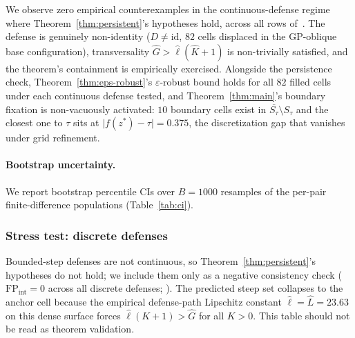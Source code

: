 \documentclass{article}
\newcommand{\cl}[1]{\overline{#1}}
\begin{document}
\begin{table}[h]
\centering
\small
\caption{Resolution sweep for the oblique-smooth defense at
progressively finer MAP-Elites grid sizes.}
\label{tab:resolution}

\end{table}

We observe zero empirical counterexamples in the
continuous-defense regime where Theorem~\ref{thm:persistent}'s
hypotheses hold, across all rows
of~.
The defense is genuinely non-identity ($D \neq \mathrm{id}$, $82$
cells displaced in the GP-oblique base configuration),
transversality $\hat G > \hat\ell(\hat K{+}1)$ is non-trivially
satisfied, and the theorem's containment is empirically
exercised. Alongside the persistence check,
Theorem~\ref{thm:eps-robust}'s $\varepsilon$-robust bound holds
for all $82$ filled cells under each continuous defense tested,
and Theorem~\ref{thm:main}'s boundary fixation is non-vacuously
activated: $10$ boundary cells exist in
$\cl{S_\tau} \setminus S_\tau$ and the closest one to $\tau$ sits
at $\lvert f(z^{*}) - \tau \rvert = 0.375$, the discretization
gap that vanishes under grid refinement.

\paragraph{Bootstrap uncertainty.}
We report bootstrap percentile CIs over $B = 1000$ resamples of
the per-pair finite-difference populations
(Table~\ref{tab:ci}).

\begin{table}[h]
\centering
\small
\caption{Bootstrap percentile CIs (median,
$[5^{\text{th}}, 95^{\text{th}}]$) over $B = 1000$ resamples of
the per-pair finite-difference populations on the saturated
live run.}
\label{tab:ci}

\end{table}

\subsubsection{Stress test: discrete defenses}
\label{sec:discrete-stress}

Bounded-step defenses are not continuous, so
Theorem~\ref{thm:persistent}'s hypotheses do not hold; we include
them only as a negative consistency check
($\text{FP}_{\text{int}} = 0$ across all discrete defenses;
). The predicted steep set collapses to the
anchor cell because the empirical defense-path Lipschitz constant
$\hat\ell = \hat L = 23.63$ on this dense surface forces
$\hat\ell(K{+}1) > \hat G$ for all $K > 0$. This table should
not be read as theorem validation.
\end{document}
